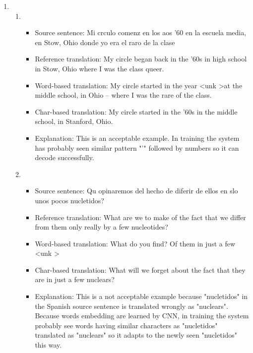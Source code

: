 \documentclass[12pt]{article}
\begin{document}
\begin{enumerate}[label=(\alph*)]
\begin{enumerate}[label=\roman*]
  \end{enumerate}
  \item 
  \begin{enumerate}[label=\roman*]
    \item
    \begin{itemize}
      \item Source sentence: Mi crculo comenz en los aos '60 en la escuela media, en Stow, Ohio donde yo era el raro de la clase
      \item Reference translation: My circle began back in the '60s  in high school in Stow, Ohio  where I was the class queer.
      \item Word-based translation: My circle started in the year \textless unk \textgreater at the middle school, in Ohio -- where I was the rare of the class.
      \item Char-based translation: My circle started in the '60s in the middle school, in Stanford, Ohio.
      \item Explanation: This is an acceptable example. In training the system has probably seen similar pattern "'" followed by numbers so it can decode successfully.
    \end{itemize}
    
    \item
    \begin{itemize}
      \item Source sentence: Qu opinaremos del hecho de diferir de ellos en slo unos pocos nucletidos?
      \item Reference translation: What are we to make of the fact  that we differ from them only really by a few nucleotides?
      \item Word-based translation: What do you find? Of them in just a few \textless unk \textgreater
      \item Char-based translation: What will we forget about the fact that they are in just a few nuclears?
      \item Explanation: This is a not acceptable example because "nucletidos" in the Spanish source sentence is translated wrongly as "nuclears". Because words embedding are learned by CNN, in training the system probably see words having similar characters as "nucletidos" translated as "nuclears" so it adapts to the newly seen "nucletidos" this way.
    \end{itemize}
  \end{enumerate}
\end{enumerate}
\end{document}
